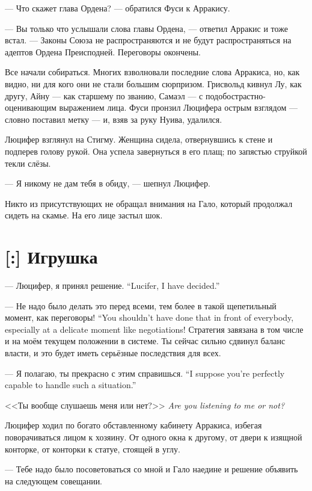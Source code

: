 --- Что скажет глава Ордена? --- обратился Фуси к Арракису.

--- Вы только что услышали слова главы Ордена, --- ответил Арракис и тоже встал.
--- Законы Союза не распространяются и не будут распространяться на адептов Ордена Преисподней.
Переговоры окончены.

Все начали собираться.
Многих взволновали последние слова Арракиса, но, как видно, ни для кого они не стали большим сюрпризом.
Грисвольд кивнул Лу, как другу, Айну --- как старшему по званию, Самаэл --- с подобострастно-оценивающим выражением лица.
Фуси пронзил Люцифера острым взглядом --- словно поставил метку --- и, взяв за руку Нуива, удалился.

Люцифер взглянул на Стигму.
Женщина сидела, отвернувшись к стене и подперев голову рукой.
Она успела завернуться в его плащ;
по запястью струйкой текли слёзы.

--- Я никому не дам тебя в обиду, --- шепнул Люцифер.

Никто из присутствующих не обращал внимания на Гало, который продолжал сидеть на скамье.
На его лице застыл шок.

\section{[:] Игрушка}

{--- Люцифер, я принял решение.}
{``Lucifer, I have decided.''}

{--- Не надо было делать это перед всеми, тем более в такой щепетильный момент, как переговоры!}
{``You shouldn't have done that in front of everybody, especially at a delicate moment like negotiations!}
Стратегия завязана в том числе и на моём текущем положении в системе.
Ты сейчас сильно сдвинул баланс власти, и это будет иметь серьёзные последствия для всех.

{--- Я полагаю, ты прекрасно с этим справишься.}
{``I suppose you're perfectly capable to handle such a situation.''}

{<<Ты вообще слушаешь меня или нет?>>}
{\textit{Are you listening to me or not?}}

Люцифер ходил по богато обставленному кабинету Арракиса, избегая поворачиваться лицом к хозяину.
От одного окна к другому, от двери к изящной конторке, от конторки к статуе, стоящей в углу.

--- Тебе надо было посоветоваться со мной и Гало наедине и решение объявить на следующем совещании.

